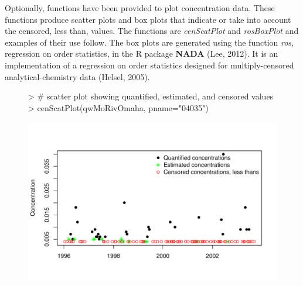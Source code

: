 \documentclass[11pt]{article}
\begin{document}
Optionally, functions have been provided to plot concentration data.  These functions produce scatter plots and box plots that indicate or take into account the censored, less than, values.  The functions are \textit{cenScatPlot} and \textit{rosBoxPlot} and examples of their use follow.  The box plots are generated using the function \textit{ros}, regression on order statistics, in the R package \textbf{NADA} (Lee, 2012).  It is an implementation of a regression on order statistics designed for multiply-censored analytical-chemistry data  (Helsel, 2005). 
\vspace{5 mm}

\begin{figure}[H]
\centering
\begin{Schunk}
\begin{Sinput}
> # scatter plot showing quantified, estimated, and censored  values
> cenScatPlot(qwMoRivOmaha, pname="04035")
\end{Sinput}
\end{Schunk}
\includegraphics{vignette-002}
\end{figure}
\end{document}
